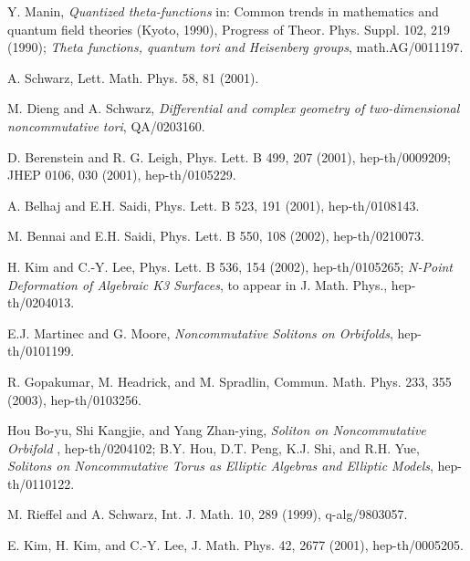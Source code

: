 \documentclass[12pt, a4paper]{article}
\begin{document}
\begin{thebibliography}{88}
 Y. Manin, {\it Quantized theta-functions} in:
Common trends in mathematics and quantum field theories (Kyoto,
1990), Progress of Theor. Phys. Suppl. 102, 219 (1990);
 {\it Theta functions, quantum tori and Heisenberg groups}, math.AG/0011197.

 A. Schwarz, Lett. Math. Phys. 58,  81 (2001).

 M. Dieng and A. Schwarz, {\it Differential and complex
geometry of two-dimensional noncommutative tori}, QA/0203160.

 D. Berenstein and R. G. Leigh, Phys. Lett. B 499,  207 (2001),
hep-th/0009209; JHEP 0106, 030 (2001), hep-th/0105229.

 A. Belhaj and E.H. Saidi, Phys. Lett. B 523, 191 (2001),
hep-th/0108143.

 M. Bennai and E.H. Saidi, Phys. Lett. B 550, 108 (2002), hep-th/0210073.

 H. Kim and C.-Y. Lee, Phys. Lett. B 536, 154 (2002), hep-th/0105265;
 {\it N-Point Deformation of Algebraic K3 Surfaces}, to appear in
     J. Math. Phys., hep-th/0204013.

  E.J. Martinec and G. Moore, {\it Noncommutative Solitons on Orbifolds},
           hep-th/0101199.

 R. Gopakumar, M. Headrick, and M. Spradlin, Commun. Math. Phys. 233, 355 (2003),
      hep-th/0103256.

 Hou Bo-yu, Shi Kangjie, and Yang Zhan-ying,
{\it Soliton on Noncommutative Orbifold \coordHE{} },
hep-th/0204102; B.Y. Hou, D.T. Peng, K.J. Shi, and R.H. Yue, {\it
Solitons on Noncommutative Torus as Elliptic Algebras and Elliptic
Models}, hep-th/0110122.




M. Rieffel and A. Schwarz,
Int. J. Math. 10, 289 (1999), q-alg/9803057.

 E. Kim, H. Kim, and C.-Y. Lee,
 J. Math. Phys. 42,  2677 (2001), hep-th/0005205.


\end{thebibliography}
\end{document}
